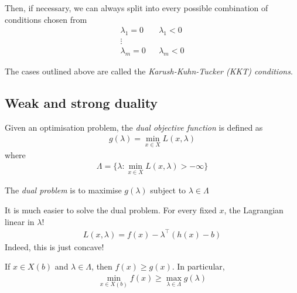 \documentclass{../template/note}
\begin{document}
    Then, if necessary, we can always split into every possible combination of conditions chosen from
    \begin{align*}
        \lambda_1 = 0 && \lambda_1 < 0 \\
        \vdots \\
        \lambda_m = 0 && \lambda_m < 0
    \end{align*}   

    \begin{remark*}
        The cases outlined above are called the \emph{Karush-Kuhn-Tucker (KKT) conditions}.
    \end{remark*}    

    \subsection{Weak and strong duality}

    \begin{definition}
        Given an optimisation problem, the \emph{dual objective function} is defined as
        \begin{align*}
            g(\lambda) = \min_{x \in X} L(x, \lambda)
        \end{align*}
        where
        \begin{align*}
            \Lambda = \{\lambda: \min_{x \in X} L(x, \lambda) > -\infty\}
        \end{align*}       
    \end{definition}
    
    \begin{definition}
        The \emph{dual problem} is to maximise $g(\lambda)$ subject to $\lambda \in \Lambda$
    \end{definition}
    
    \begin{remark*}
        It is much easier to solve the dual problem. For every fixed $x$, the Lagrangian linear in $\lambda$!
        \begin{align*}
            L(x, \lambda) = f(x) - \lambda^\intercal (h(x)-b)
        \end{align*}
        Indeed, this is just concave!        
    \end{remark*}
    
    \begin{theorem}
        If $x \in X(b)$ and $\lambda \in \Lambda$, then $f(x) \geq g(x)$. In particular,
        \begin{align*}
            \min_{x \in X(b)} f(x) \geq \max_{\lambda \in \Lambda} g(\lambda)
        \end{align*}
    \end{theorem}
    
\end{document}
